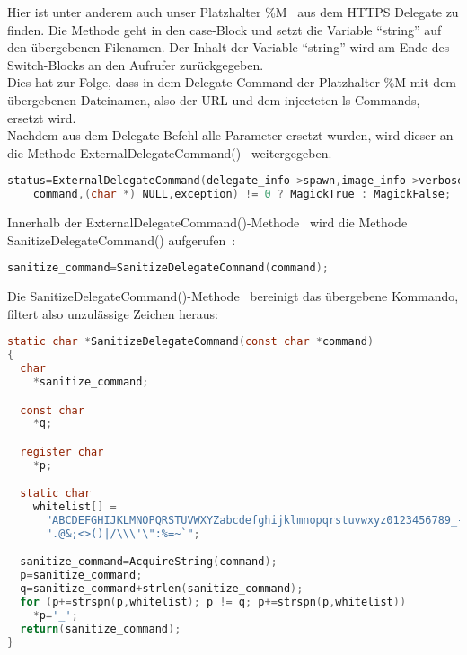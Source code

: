 Hier ist unter anderem auch unser Platzhalter \%M~\cite{caseM} aus dem HTTPS Delegate zu finden.
Die Methode geht in den case-Block und setzt die Variable "`string"' auf den übergebenen Filenamen.
Der Inhalt der Variable "`string"' wird am Ende des Switch-Blocks an den Aufrufer zurückgegeben.\\

Dies hat zur Folge, dass in dem Delegate-Command der Platzhalter \%M mit dem übergebenen Dateinamen,
also der URL und dem injecteten ls-Commands, ersetzt wird.\\

Nachdem aus dem Delegate-Befehl alle Parameter ersetzt wurden, wird dieser an die Methode ExternalDelegateCommand()~\cite{CallExternalDelegateCommand} weitergegeben.

\begin{lstlisting}[firstnumber=1301, language=C, caption=magick/delegate.c Aufruf ExternalDelegateCommand(),label={lst:lstlisting}]
  status=ExternalDelegateCommand(delegate_info->spawn,image_info->verbose,
    command,(char *) NULL,exception) != 0 ? MagickTrue : MagickFalse;
\end{lstlisting}
\vspace{5mm}

Innerhalb der ExternalDelegateCommand()-Methode~\cite{DeklarationExternalDelegateCommand} wird die Methode SanitizeDelegateCommand() aufgerufen~\cite{CallSanatizeDelegateCommand}:\\

\begin{lstlisting}[firstnumber=395, language=C, caption=magick/delegate.c Aufruf SanitizeDelegateCommand(),label={lst:lstlisting}]
  sanitize_command=SanitizeDelegateCommand(command);
\end{lstlisting}
\vspace{5mm}

\newpage

Die SanitizeDelegateCommand()-Methode~\cite{DeclareSanatizeDelegateCommand} bereinigt das übergebene Kommando, filtert also unzulässige Zeichen heraus:\\

\begin{lstlisting}[firstnumber=322, language=C, caption=magick/delegate.c SanitizieDelegateCommand(),label={lst:lstlisting}]
static char *SanitizeDelegateCommand(const char *command)
{
  char
    *sanitize_command;

  const char
    *q;

  register char
    *p;

  static char
    whitelist[] =
      "ABCDEFGHIJKLMNOPQRSTUVWXYZabcdefghijklmnopqrstuvwxyz0123456789_- "
      ".@&;<>()|/\\\'\":%=~`";

  sanitize_command=AcquireString(command);
  p=sanitize_command;
  q=sanitize_command+strlen(sanitize_command);
  for (p+=strspn(p,whitelist); p != q; p+=strspn(p,whitelist))
    *p='_';
  return(sanitize_command);
}
\end{lstlisting}
\vspace{5mm}

